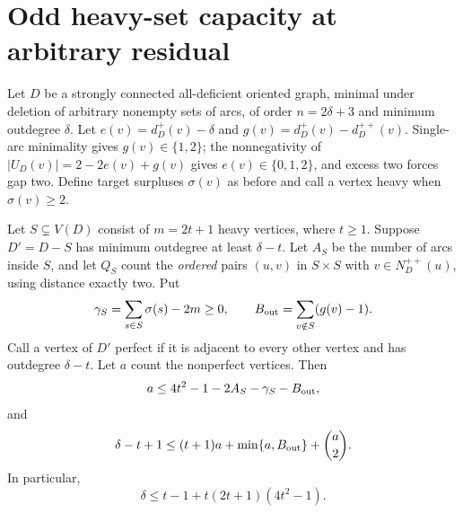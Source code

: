 \section{Odd heavy-set capacity at arbitrary residual}
\label{sec:general-odd-capacity}

Let $D$ be a strongly connected all-deficient oriented graph, minimal
under deletion of arbitrary nonempty sets of arcs, of order
$n=2\delta+3$ and minimum outdegree $\delta$.  Let
$e(v)=d_D^+(v)-\delta$ and $g(v)=d_D^+(v)-d_D^{++}(v)$.
Single-arc minimality gives $g(v)\in\{1,2\}$; the nonnegativity of
$|U_D(v)|=2-2e(v)+g(v)$ gives $e(v)\in\{0,1,2\}$, and excess two
forces gap two.  Define target surpluses $\sigma(v)$ as before and
call a vertex heavy when $\sigma(v)\ge2$.

\begin{theorem}\label{thm:general-odd-capacity}
Let $S\subsetneq V(D)$ consist of $m=2t+1$ heavy vertices, where
$t\ge1$.  Suppose $D'=D-S$ has minimum outdegree at least $\delta-t$.
Let $A_S$ be the number of arcs inside $S$, and let $Q_S$ count the
\emph{ordered} pairs $(u,v)$ in $S\times S$ with
$v\in N_D^{++}(u)$, using distance exactly two.  Put
\[
 \gamma_S=\sum_{s\in S}\sigma(s)-2m\ge0,\qquad
 B_{\rm out}=\sum_{v\notin S}(g(v)-1).
\]
Call a vertex of $D'$ perfect if it is adjacent to every other vertex
and has outdegree $\delta-t$.  Let $a$ count the nonperfect vertices.
Then
\begin{equation}\label{eq:general-odd-a}
 {a\le4t^2-1-2A_S-\gamma_S-B_{\rm out},}
\end{equation}
and
\begin{equation}\label{eq:general-odd-degree}
 {\delta-t+1\le(t+1)a+\min\{a,B_{\rm out}\}+\binom a2.}
\end{equation}
In particular,
\begin{equation}\label{eq:general-odd-coarse}
 \delta\le t-1+t(2t+1)(4t^2-1).
\end{equation}
\end{theorem}

